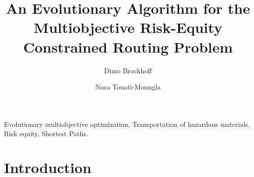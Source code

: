 \documentclass[preprint,12pt]{elsarticle}
\begin{document}
\begin{frontmatter}



\title{An Evolutionary Algorithm for the Multiobjective Risk-Equity Constrained Routing Problem}


\author{Dimo Brockhoff}
\address{INRIA Lille - Nord Europe, DOLPHIN team, 59650 Villeneuve d'Ascq, France\\
{\upshape \url{dimo.brockhoff@inria.fr}}}

\author{Nora Touati-Moungla}
\address{Laboratoire d'Informatique, \'{E}cole Polytechnique, 91128 Palaiseau Cedex, France\\
{\upshape \url{touati@lix.polytechnique.fr}}}



\begin{abstract}


\end{abstract}

\begin{keyword}
Evolutionary multiobjective optimization, Transportation of hazardous materials, Risk equity, Shortest Paths. 
\end{keyword}

\end{frontmatter}
\section{Introduction}
\end{document}

